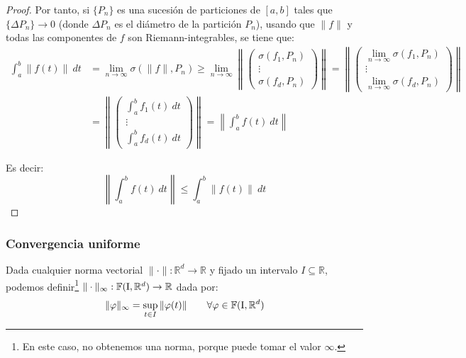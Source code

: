 \begin{prop}
\begin{proof}
        Por tanto, si $\{P_n\}$ es una sucesión de particiones de $[a,b]$ tales que $\{\Delta P_n\}\longrightarrow 0$ (donde $\Delta P_n$ es el diámetro de la partición $P_n$), usando que $\|f\|$ y todas las componentes de $f$ son Riemann-integrables, se tiene que:
        \begin{align*}
            \int_{a}^{b} \|f(t)\|~dt &= \lim_{n\to\infty}\sigma(\|f\|, P_n) \geq \lim_{n\to\infty} \left\| \left(\begin{array}{c}
                \sigma(f_1,P_n) \\
                \vdots  \\
                \sigma(f_d,P_n) 
            \end{array}\right) \right\|    = \left\| \left(\begin{array}{c}
                \displaystyle\lim_{n\to\infty} \sigma(f_1,P_n) \\
                \vdots  \\
                \displaystyle\lim_{n\to\infty}  \sigma(f_d,P_n) 
            \end{array}\right) \right\| \\
                                     &=  \left\| \left(\begin{array}{c}
                \int_{a}^{b} f_1(t)~dt  \\
                \vdots \\
                \int_{a}^{b} f_d(t)~dt  
            \end{array}\right) \right\| = \left\|\int_{a}^{b} f(t)~dt \right\|
        \end{align*}

        Es decir:
    \begin{equation*}
        \left\|\int_{a}^{b} f(t)~dt \right\| \leq \int_{a}^{b} \|f(t)\|~dt 
    \end{equation*}
    \end{proof}
\end{prop}

\subsubsection{Convergencia uniforme}
\noindent
Dada cualquier norma vectorial $\|\cdot \|:\mathbb{R}^d\rightarrow\mathbb{R}$ y fijado un intervalo $I\subseteq \mathbb{R}$, podemos definir\footnote{En este caso, no obtenemos una norma, porque puede tomar el valor $\infty$.} $\|\cdot \|_\infty:\mathbb{F}(\text{I},\mathbb{R}^d)\rightarrow\mathbb{R}$ dada por:
\begin{equation*}
    \|\varphi\|_\infty = \sup_{t\in I}\|\varphi(t)\| \qquad \forall \varphi \in \mathbb{F}(\text{I},\mathbb{R}^d)
\end{equation*}

